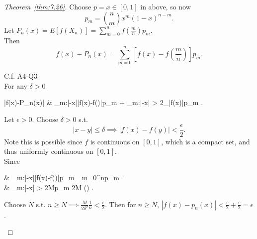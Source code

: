 \begin{proof}[Theorem~\ref{thm:7.26}]
	Choose $p=x \in [0,1]$ in above, so now \[
		p_m= \binom{n}{m}x^{m}(1-x)^{n-m}
		.\]
	Let $P_{n}(x)=E \left[ f(X_n)\right]=\sum_{m=0}^{n}{f(\frac{m}{n})p_m}$.\\
	Then \[
		f(x)-P_n(x)=\sum_{m=0}^{n}{\left[ f(x)-f(\frac{m}{n})\right]p_m}
		.\]
	\begin{remark}
		C.f. A4-Q3\\
		For any $\delta>0$
		\begin{flalign*}
			\left|f(x)-P_n(x)\right| & \le \sum_{m:\left|-x\right|\le \delta}{\left|f(x)-f()\right|p_m} + \sum_{m:\left|-x\right| > \delta}{2_{\sup\left|f(x)\right|}p_m}
			.\end{flalign*}
		Let $\epsilon>0$. Choose $\delta>0$ s.t. \[
			\left|x-y\right| \le \delta \implies \left|f(x)-f(y)\right|<\frac{\epsilon}{2}
			.\]
			Note this is possible since $f$ is continuous on $[0,1]$, which is a compact set, and thus uniformly continuous on $[0,1]$.\\
		Since
		\begin{flalign*}
			 & \sum_{m:\left|-x\right|\le \delta}{\left|f(x)-f()\right|p_m}  \le  {}	 \sum_{m=0}^{n}{p_m}=                                                                       \\
			 & \sum_{m:\left|-x\right| > \delta}{2Mp_m}                                 \le 2M  \le {}  \;\;(\because \text{Chebyshev's})
			.\end{flalign*}
		Choose $N$ s.t. $n\ge N\implies \frac{M}{2\delta^2}\frac{1}{n}<\frac{\epsilon}{2}$.
		Then for $n\ge N$, $\left|f(x)-p_n(x)\right|<\frac{\epsilon}{2}+\frac{\epsilon}{2}=\epsilon$.
	\end{remark}
\end{proof}


